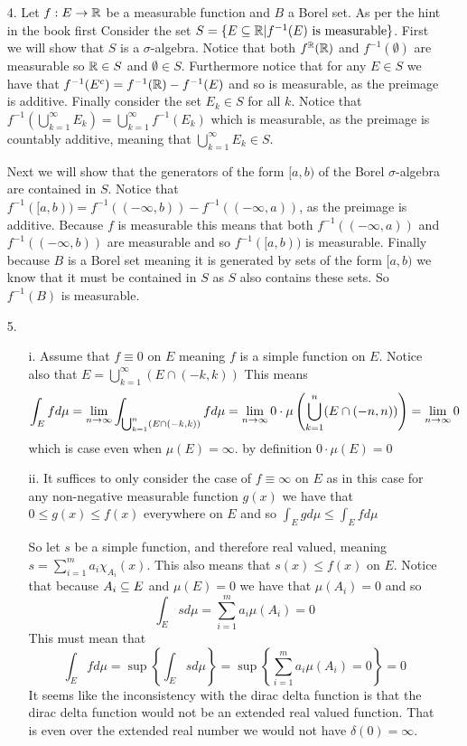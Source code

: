 \documentclass[12pt]{amsart}
\begin{document}
\begin{itemize}
\begin{itemize}
   \end{itemize} 
   \item[4.] Let $f:E\rightarrow \mathbb{R}$ be a measurable function and $B$ a Borel set.
             As per the hint in the book first Consider the set $S=\{E\subseteq \mathbb{R} | f^{-1}(E)\text{ is measurable}\}$.
             First we will show that $S$ is a $\sigma$-algebra. Notice that 
             both $f^{\mathbb{R}}(\mathbb{R})$ and $f^{-1}(\emptyset)$ are measurable so $\mathbb{R}\in S$ and $\emptyset\in S$.
             Furthermore notice that for any $E\in S$ we have that $f^{-1}(E^c)=f^{-1}(\mathbb{R})-f^{-1}(E)$ and so is measurable, as the preimage is additive. 
             Finally consider the set $E_k\in S$ for all $k$. Notice that $f^{-1}(\bigcup_{k=1}^\infty E_k)=\bigcup_{k=1}^\infty f^{-1}(E_k)$
             which is measurable, as the preimage is countably additive, meaning that $\bigcup_{k=1}^\infty E_k\in S$.
             
             Next we will show that the generators of the form $[a,b)$ of the Borel $\sigma$-algebra are contained in $S$. 
             Notice that $f^{-1}([a,b))=f^{-1}((-\infty, b))-f^{-1}((-\infty, a))$, as the preimage is additive.
             Because $f$ is measurable this means that both $f^{-1}((-\infty, a))$ and $f^{-1}((-\infty, b))$
             are measurable and so $f^{-1}([a,b))$ is measurable. Finally because 
             $B$ is a Borel set meaning it is generated by sets of the form $[a,b)$ we know that it must be contained in $S$
             as $S$ also contains these sets. So $f^{-1}(B)$ is measurable.


    \item[5.] 
    \begin{itemize}
        \item[i.] Assume that $f\equiv 0$ on $E$ meaning $f$ is a simple function on $E$. Notice also that $E=\bigcup_{k=1}^{\infty}(E\cap(-k,k))$ This means
              \[\int_E f d\mu= \lim_{n\rightarrow \infty}\int_{\bigcup_{k=1}^{n}(E\cap(-k,k))} f d\mu=\lim_{n\rightarrow \infty}0\cdot\mu\left(\bigcup_{k=1}^{n}(E\cap(-n,n))\right)=\lim_{n\rightarrow \infty} 0\]
              which is case even when $\mu(E)=\infty$.
              by definition $0\cdot \mu(E)=0$
        \item[ii.] It suffices to only consider the case of $f\equiv \infty$ on $E$ as in this case for any non-negative 
        measurable function $g(x)$ we have that $0\leq g(x)\leq f(x)$ everywhere on $E$ and so $\int_E g d\mu\leq \int_E f d\mu$

        So let $s$ be a simple function, and therefore real valued, meaning $s=\sum_{i=1}^m a_i \chi_{A_i}(x)$. 
        This also means that $s(x)\leq f(x)$ on $E$. Notice that because $A_i\subseteq E$ and $\mu(E)=0$ we have that $\mu(A_i)=0$ and so
        \[\int_E s d\mu=\sum_{i=1}^m a_i\mu(A_i)=0\]
        This must mean that 
        \[\int_E f d\mu=\sup\left\{\int_E s d\mu\right\} = \sup\left\{\sum_{i=1}^m a_i\mu(A_i)=0\right\}=0\]
        It seems like the inconsistency with the dirac delta function is that the dirac delta function would not be
        an extended real valued function. That is even over the extended real number we would not have $\delta(0)=\infty$. 


\end{itemize}
\end{itemize}
\end{document}
